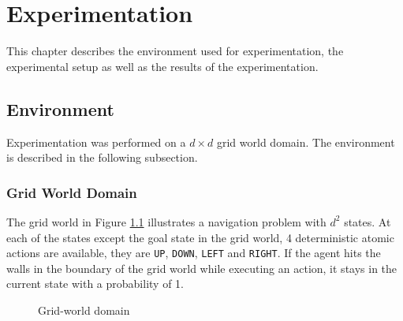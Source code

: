 
\chapter{Experimentation}

This chapter describes the environment used for experimentation, the experimental setup as well as the results of the experimentation.

\section{Environment}

Experimentation was performed on a $d \times d$ grid world domain. The environment is described in the following subsection.

\subsection*{Grid World Domain}

The grid world in Figure \ref{fig:grid_domain} illustrates a navigation problem with $d^2$ states.
At each of the states except the goal state in the grid world, 4 deterministic atomic actions are available, they are \texttt{UP}, \texttt{DOWN}, \texttt{LEFT} and \texttt{RIGHT}.
If the agent hits the walls in the boundary of the grid world while executing an action, it stays in the current state with a probability of 1.

\begin{figure}[!htbp]
    \centering
    
    \caption{Grid-world domain}
    \label{fig:grid_domain}
\end{figure}


